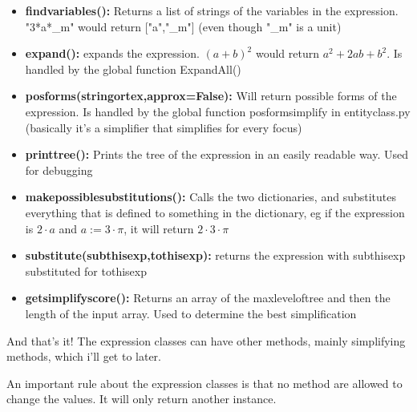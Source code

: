 \documentclass[11pt]{article}
\begin{document}
\begin{itemize}
\item \textbf{findvariables():} Returns a list of strings of the variables in the expression. "3*a*\_m" would return ["a","\_m"] (even though "\_m" is a unit)
\item \textbf{expand():} expands the expression. $(a+b)^2$ would return $a^2+2ab+b^2$. Is handled by the global function ExpandAll()
\item \textbf{posforms(stringortex,approx=False):} Will return possible forms of the expression. Is handled by the global function posformsimplify in entityclass.py (basically it's a simplifier that simplifies for every focus)
\item \textbf{printtree():} Prints the tree of the expression in an easily readable way. Used for debugging
\item \textbf{makepossiblesubstitutions():} Calls the two dictionaries, and substitutes everything that is defined to something in the dictionary, eg if the expression is $2\cdot a$ and $a:=3\cdot \pi$, it will return $2\cdot 3\cdot \pi$
\item \textbf{substitute(subthisexp,tothisexp):} returns the expression with subthisexp substituted for tothisexp
\item \textbf{getsimplifyscore():} Returns an array of the maxleveloftree and then the length of the input array. Used to determine the best simplification

\end{itemize}
And that's it! The expression classes can have other methods, mainly simplifying methods, which i'll get to later.

An important rule about the expression classes is that no method are allowed to change the values. It will only return another instance.
\end{document}
